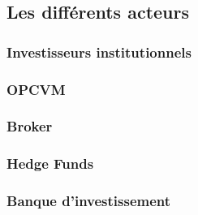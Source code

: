 \subsection{Les différents acteurs}

\subsubsection{Investisseurs institutionnels}

\subsubsection{OPCVM}

\subsubsection{Broker}

\subsubsection{Hedge Funds}

\subsubsection{Banque d'investissement}
